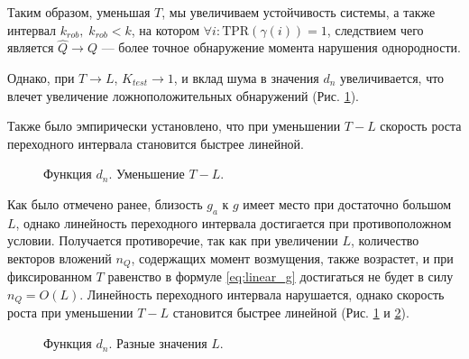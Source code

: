 \documentclass[specialist, substylefile = spbu.rtx,
			   subf, href, 12pt]{disser}
\begin{document}
\newpage
Таким образом, уменьшая $ T $, мы увеличиваем устойчивость системы, а также интервал $ k_{rob}, \; k_{rob} < k $, на котором $ \forall i: \mathrm{TPR}(\gamma(i)) = 1 $, следствием чего является $ \hat{Q} \rightarrow Q $ --- более точное обнаружение момента нарушения однородности.

Однако, при $ T \rightarrow L $, $ K_{test} \rightarrow 1 $, и вклад шума в значения $ d_n $ увеличивается, что влечет увеличение ложноположительных обнаружений (Рис. \ref{pic:decreasing_T}). 

Также было эмпирически установлено, что при уменьшении $ T - L $ скорость роста переходного интервала становится быстрее линейной.

\begin{figure}[!hhh]
	\caption{Функция $ d_n $. Уменьшение $ T - L $.}
	\label{pic:decreasing_T}
\end{figure}

Как было отмечено ранее, близость $ g_a $ к $ g $ имеет место при достаточно большом $ L $, однако линейность переходного интервала достигается при противоположном условии. Получается противоречие, так как при увеличении $ L $, количество векторов вложений $ n_Q $, содержащих момент возмущения, также возрастет, и при фиксированном $ T $ равенство в формуле \eqref{eq:linear_g} достигаться не будет в силу $ n_Q = O(L) $. Линейность переходного интервала нарушается, однако скорость роста при уменьшении $ T - L $ становится быстрее линейной (Рис. \ref{pic:decreasing_T} и \ref{pic:row_diff_L}). 

\begin{figure}[!hhh]
	\caption{Функция $ d_n $. Разные значения $ L $.}
	\label{pic:row_diff_L}
\end{figure}
\end{document}
